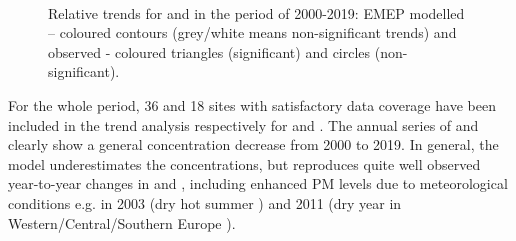 \begin{figure}  %
  \\
\caption{Relative trends for \PM[10] and \PM[2.5] in the period of 2000-2019: EMEP modelled -- coloured contours (grey/white means non-significant trends) and observed - coloured triangles (significant) and circles (non-significant).}
\label{fig:PMtrends}
\end{figure}


For the whole period, 36 and 18 sites with satisfactory data coverage have been included in the trend analysis respectively for \PM[10] and \PM[2.5]. The annual series of \PM[10] and \PM[2.5] clearly show a general concentration decrease from 2000 to 2019. In general, the model underestimates the concentrations, but reproduces quite well observed year-to-year changes in \PM[10] and \PM[2.5], including enhanced PM levels due to meteorological conditions e.g. in 2003 (dry hot summer \citep{EMEP:PM2005}) and 2011 (dry year in Western/Central/Southern Europe \citep{EMEP:PM2013}).


